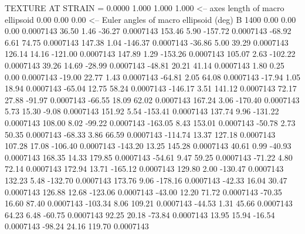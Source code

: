 TEXTURE AT STRAIN =    0.0000
   1.000   1.000   1.000  <-- axes length of macro ellipsoid
    0.00    0.00    0.00  <-- Euler angles of macro ellipsoid (deg)
B      1400
        0.00        0.00        0.00     0.0007143
       36.50        1.46      -36.27     0.0007143
      153.46        5.90     -157.72     0.0007143
      -68.92        6.61       74.75     0.0007143
      147.38        1.04     -146.37     0.0007143
      -36.86        5.00       39.29     0.0007143
      126.14       14.16     -121.00     0.0007143
      147.89        1.29     -153.26     0.0007143
      105.07        2.63     -102.22     0.0007143
       39.26       14.69      -28.99     0.0007143
      -48.81       20.21       41.14     0.0007143
        1.80        0.25        0.00     0.0007143
      -19.00       22.77        1.43     0.0007143
      -64.81        2.05       64.08     0.0007143
      -17.94        1.05       18.94     0.0007143
      -65.04       12.75       58.24     0.0007143
     -146.17        3.51      141.12     0.0007143
       72.17       27.88      -91.97     0.0007143
      -66.55       18.09       62.02     0.0007143
      167.24        3.06     -170.40     0.0007143
        5.73       15.30       -9.08     0.0007143
      151.92        5.54     -153.41     0.0007143
      137.74        9.96     -131.22     0.0007143
      108.00        8.02      -99.22     0.0007143
     -163.05        8.43      153.01     0.0007143
      -50.78        2.73       50.35     0.0007143
      -68.33        3.86       66.59     0.0007143
     -114.74       13.37      127.18     0.0007143
      107.28       17.08     -106.40     0.0007143
     -143.20       13.25      145.28     0.0007143
       40.61        0.99      -40.93     0.0007143
      168.35       14.33      179.85     0.0007143
      -54.61        9.47       59.25     0.0007143
      -71.22        4.80       72.14     0.0007143
      172.94       13.71     -165.12     0.0007143
      129.80        2.00     -130.47     0.0007143
      132.23        5.48     -132.70     0.0007143
      173.76        9.06     -178.16     0.0007143
      -42.33       16.04       30.47     0.0007143
      126.88       12.68     -123.06     0.0007143
      -43.00       12.20       71.72     0.0007143
      -70.35       16.60       87.40     0.0007143
     -103.34        8.06      109.21     0.0007143
      -44.53        1.31       45.66     0.0007143
       64.23        6.48      -60.75     0.0007143
       92.25       20.18      -73.84     0.0007143
       13.95       15.94      -16.54     0.0007143
      -98.24       24.16      119.70     0.0007143
